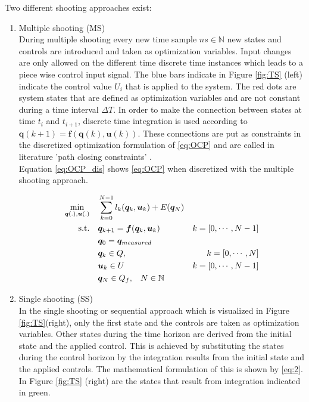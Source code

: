 Two different shooting approaches exist:\\
\begin{enumerate}
	\item Multiple shooting (MS)\\
	During multiple shooting every new time sample $ns\in \mathbb{N}$ new states and controls are introduced and taken as optimization variables.
	Input changes are only allowed on the different time discrete time instances which leads to a piece wise control input signal. The blue bars indicate in Figure \ref{fig:TS} (left) indicate the control value $U_i$ that is applied to the system.  The red dots are system states that are defined as optimization variables and are not constant during a time interval $\Delta T$. In order to make the connection between states at time $t_i$ and $t_{i+1}$, discrete time integration is used according to $\bm{q}(k+1) = \bm{f}(\bm{q}(k), \bm{u}(k))$. These connections are put as constraints in the discretized optimization formulation of \ref{eq:OCP} and are called in literature 'path closing constraints' \cite{Gillis2019}. \\ Equation \ref{eq:OCP_dis} shows \ref{eq:OCP} when discretized with the multiple shooting approach. 

	\begin{equation}
	\label{eq:OCP_dis}
	\begin{aligned}
	\min_{\bm{q}(.),\bm{u}(.)} \quad & \sum_{k = 0}^{N-1}l_{k}(\bm{q}_{k},\bm{u}_{k}) + E(\bm{q}_{N}) \\
	\textrm{s.t.} \quad & \bm{q}_{k+1} = \bm{f}(\bm{q}_{k}, \bm{u}_{k}) & k = [0,\cdots, N-1]\\
	& \bm{q}_{0}= \bm{q}_{measured} \\
	& \bm{q}_{k}\in Q,\hspace{3 mm} & k = [0,\cdots, N]\\
	& \bm{u}_{k}\in U \hspace{3 mm} & k = [0,\cdots, N-1]\\
	& \bm{q}_{N}\in Q_f,\hspace{3 mm} N \in \mathbb{N}
	\end{aligned}
	\end{equation}
	
	\item Single shooting (SS)\\  
	In the single shooting or sequential approach which is visualized in Figure \ref{fig:TS}(right), only the first state and the controls are taken as optimization variables. Other states during the time horizon are derived from the initial state and the applied control. This is achieved by substituting the states during the control horizon by the integration results from the initial state and the applied controls. The mathematical formulation of this is shown by \ref{eq:2}. In Figure \ref{fig:TS} (right) are the states that result from integration indicated in green. \cite{Gillis2019}
	

\end{enumerate}
